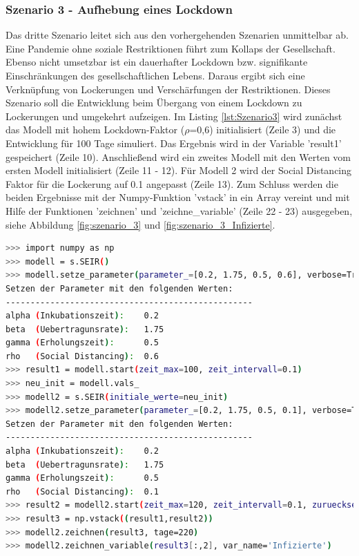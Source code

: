 \documentclass[12pt]{article}
\begin{document}
\subsubsection{Szenario 3 - Aufhebung eines Lockdown}
Das dritte Szenario leitet sich aus den vorhergehenden Szenarien unmittelbar ab. Eine Pandemie ohne soziale Restriktionen führt zum Kollaps der Gesellschaft. Ebenso nicht umsetzbar ist ein dauerhafter Lockdown bzw. signifikante Einschränkungen des gesellschaftlichen Lebens. Daraus ergibt sich eine Verknüpfung von Lockerungen und Verschärfungen der Restriktionen. Dieses Szenario soll die Entwicklung beim Übergang von einem Lockdown zu Lockerungen und umgekehrt aufzeigen. Im Listing \ref{lst:Szenario3} wird zunächst das Modell mit hohem Lockdown-Faktor ($\rho$=0,6) initialisiert (Zeile 3) und die Entwicklung für 100 Tage simuliert. Das Ergebnis wird in der Variable 'result1' gespeichert (Zeile 10). Anschließend wird ein zweites Modell mit den Werten vom ersten Modell initialisiert (Zeile 11 - 12). Für Modell 2 wird der Social Distancing Faktor für die Lockerung auf 0.1 angepasst (Zeile 13). Zum Schluss werden die beiden Ergebnisse mit der Numpy-Funktion 'vstack' in ein Array vereint und mit Hilfe der Funktionen 'zeichnen' und 'zeichne\_variable' (Zeile 22 - 23) ausgegeben, siehe Abbildung \ref{fig:szenario_3} und \ref{fig:szenario_3_Infizierte}.

\begin{lstlisting}[language=Bash, caption=Szenario 3 - Aufhebung eines Lockdown, label=lst:Szenario3]
>>> import numpy as np
>>> modell = s.SEIR()
>>> modell.setze_parameter(parameter_=[0.2, 1.75, 0.5, 0.6], verbose=True)
Setzen der Parameter mit den folgenden Werten:
--------------------------------------------------
alpha (Inkubationszeit):    0.2
beta  (Uebertragunsrate):   1.75
gamma (Erholungszeit):      0.5
rho   (Social Distancing):  0.6
>>> result1 = modell.start(zeit_max=100, zeit_intervall=0.1)
>>> neu_init = modell.vals_
>>> modell2 = s.SEIR(initiale_werte=neu_init)
>>> modell2.setze_parameter(parameter_=[0.2, 1.75, 0.5, 0.1], verbose=True)
Setzen der Parameter mit den folgenden Werten:
--------------------------------------------------
alpha (Inkubationszeit):    0.2
beta  (Uebertragunsrate):   1.75
gamma (Erholungszeit):      0.5
rho   (Social Distancing):  0.1
>>> result2 = modell2.start(zeit_max=120, zeit_intervall=0.1, zuruecksetzen=False)
>>> result3 = np.vstack((result1,result2))
>>> modell2.zeichnen(result3, tage=220)
>>> modell2.zeichnen_variable(result3[:,2], var_name='Infizierte')
\end{lstlisting}
\end{document}

